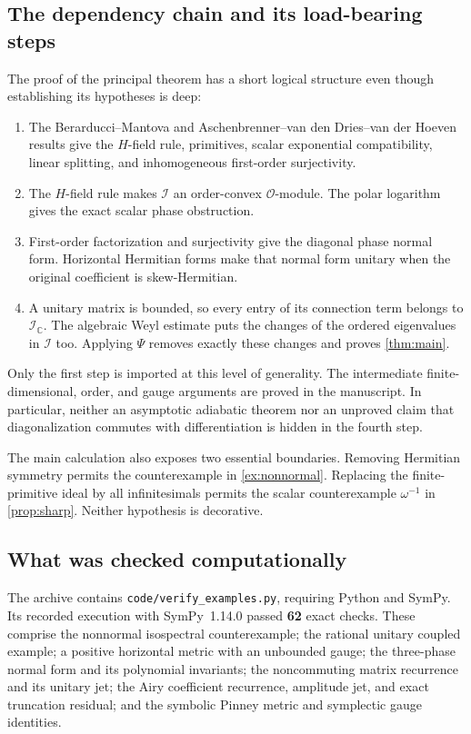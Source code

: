 \documentclass[11pt,a4paper]{article}
\numberwithin{equation}{section}
\theoremstyle{definition}
\theoremstyle{remark}
\newcommand{\C}{\mathbb C}
\newcommand{\OO}{\mathcal O}
\newcommand{\II}{\mathcal I}
\begin{document}
\subsection{The dependency chain and its load-bearing steps}
The proof of the principal theorem has a short logical structure even
though establishing its hypotheses is deep:
\begin{enumerate}
\item The Berarducci--Mantova and Aschenbrenner--van den Dries--van der
Hoeven results give the $H$-field rule, primitives, scalar exponential
compatibility, linear splitting, and inhomogeneous first-order
surjectivity.
\item The $H$-field rule makes $\II$ an order-convex $\OO$-module.
The polar logarithm gives the exact scalar phase obstruction.
\item First-order factorization and surjectivity give the diagonal
phase normal form. Horizontal Hermitian forms make that normal form
unitary when the original coefficient is skew-Hermitian.
\item A unitary matrix is bounded, so every entry of its connection
term belongs to $\II_{\C}$. The algebraic Weyl estimate puts the changes
of the ordered eigenvalues in $\II$ too. Applying $\Psi$ removes exactly
these changes and proves \cref{thm:main}.
\end{enumerate}
Only the first step is imported at this level of generality. The
intermediate finite-dimensional, order, and gauge arguments are proved
in the manuscript. In particular, neither an asymptotic adiabatic theorem
nor an unproved claim that diagonalization commutes with differentiation
is hidden in the fourth step.

The main calculation also exposes two essential boundaries. Removing
Hermitian symmetry permits the counterexample in \cref{ex:nonnormal}.
Replacing the finite-primitive ideal by all infinitesimals permits the
scalar counterexample $\omega^{-1}$ in \cref{prop:sharp}. Neither
hypothesis is decorative.

\subsection{What was checked computationally}
The archive contains \texttt{code/verify\_examples.py}, requiring Python
and SymPy. Its recorded execution with SymPy~1.14.0 passed \textbf{62}
exact checks. These comprise the nonnormal isospectral counterexample;
the rational unitary coupled example; a positive horizontal metric with
an unbounded gauge; the three-phase normal form and its polynomial
invariants; the noncommuting matrix recurrence and its unitary jet; the
Airy coefficient recurrence, amplitude jet, and exact truncation
residual; and the symbolic Pinney metric and symplectic gauge identities.
\end{document}
